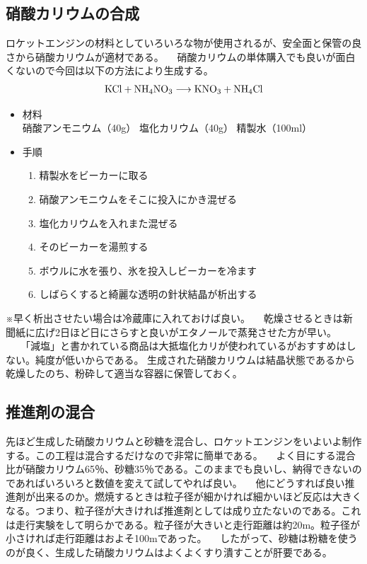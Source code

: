 \subsection{硝酸カリウムの合成}
ロケットエンジンの材料としていろいろな物が使用されるが、安全面と保管の良さから硝酸カリウムが適材である。
　硝酸カリウムの単体購入でも良いが面白くないので今回は以下の方法により生成する。
\begin{eqnarray*}
  \rm{KCl} + \rm{NH}_4\rm{NO}_3 \longrightarrow \rm{KNO}_3+\rm{NH}_4\rm{Cl}
\end{eqnarray*}
\begin{itemize}
\item 材料\\
硝酸アンモニウム（40g）
塩化カリウム（40g）
精製水（100ml）

\item	手順
  \begin{enumerate}
    \item	精製水をビーカーに取る
    \item	硝酸アンモニウムをそこに投入にかき混ぜる
    \item	塩化カリウムを入れまた混ぜる
    \item そのビーカーを湯煎する
    \item ボウルに水を張り、氷を投入しビーカーを冷ます
    \item しばらくすると綺麗な透明の針状結晶が析出する
  \end{enumerate}
\end{itemize}
※早く析出させたい場合は冷蔵庫に入れておけば良い。
　乾燥させるときは新聞紙に広げ2日ほど日にさらすと良いがエタノールで蒸発させた方が早い。
　　「減塩」と書かれている商品は大抵塩化カリが使われているがおすすめはしない。純度が低いからである。
生成された硝酸カリウムは結晶状態であるから乾燥したのち、粉砕して適当な容器に保管しておく。
\subsection{推進剤の混合}
先ほど生成した硝酸カリウムと砂糖を混合し、ロケットエンジンをいよいよ制作する。この工程は混合するだけなので非常に簡単である。
　よく目にする混合比が硝酸カリウム65％、砂糖35％である。このままでも良いし、納得できないのであればいろいろと数値を変えて試してやれば良い。
　他にどうすれば良い推進剤が出来るのか。燃焼するときは粒子径が細かければ細かいほど反応は大きくなる。つまり、粒子径が大きければ推進剤としては成り立たないのである。これは走行実験をして明らかである。粒子径が大きいと走行距離は約20m。粒子径が小さければ走行距離はおよそ100mであった。
　したがって、砂糖は粉糖を使うのが良く、生成した硝酸カリウムはよくよくすり潰すことが肝要である。

